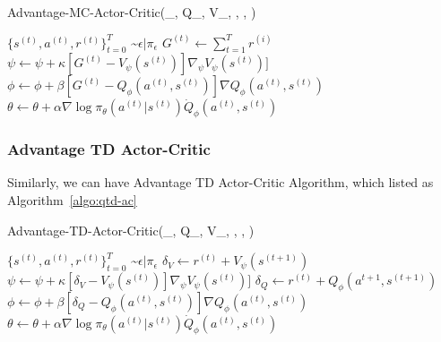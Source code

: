 \documentclass[11pt]{article}
\begin{document}
\begin{algorithm}[H]
\caption{Advantage-MC-Actor-Critic(\pi_{\epsilon}, Q_\phi, V_\psi, \alpha, \beta, \kappa)}
\label{algo:qmc-ac}
\begin{algorithmic}[1]
\STATE $\{ s^{(t)}, a^{(t)}, r^{(t)} \}_{t=0}^T$ \sim $\mathcal{\epsilon} | \pi_{\epsilon}$ 
\STATE $G^{(t)} \leftarrow \sum_{t=1}^T r^{(i)}$
\STATE $\psi \leftarrow \psi + \kappa[G^{(t)} - V_\psi (s^{(t)})] \nabla_\psi V_\psi(s^{(t)})]$
\STATE $\phi \leftarrow \phi + \beta[G^{(t)} - Q_\phi (a^{(t)}, s^{(t)})]\nabla Q_\phi (a^{(t)}, s^{(t)})$
\STATE $\theta \leftarrow \theta + \alpha \nabla \log \pi_\theta (a^{(t)} | s^{(t)}) \dot Q_\phi (a^{(t)}, s^{(t)})$

\ENDFOR
\ENDFOR
\end{algorithmic}
\end{algorithm}

\subsubsection{Advantage TD Actor-Critic}
Similarly, we can have Advantage TD Actor-Critic Algorithm, which listed as Algorithm~\ref{algo:qtd-ac}
\begin{algorithm}[H]
\caption{Advantage-TD-Actor-Critic(\pi_{\epsilon}, Q_\phi, V_\psi, \alpha, \beta, \kappa)}
\label{algo:qtd-ac}
\begin{algorithmic}[1]
\STATE $\{ s^{(t)}, a^{(t)}, r^{(t)} \}_{t=0}^T$ \sim $\mathcal{\epsilon} | \pi_{\epsilon}$ 
\STATE $\delta_V \leftarrow r^{(t)} + V_\psi (s^{(t+1)})$
\STATE $\psi \leftarrow \psi + \kappa[\delta_V - V_\psi (s^{(t)})] \nabla_\psi V_\psi(s^{(t)})]$
\STATE $\delta_Q \leftarrow r^{(t)} + Q_\phi (a^{t+1}, s^{(t+1)})$
\STATE $\phi \leftarrow \phi + \beta[\delta_Q - Q_\phi (a^{(t)}, s^{(t)})]\nabla Q_\phi (a^{(t)}, s^{(t)})$
\STATE $\theta \leftarrow \theta + \alpha \nabla \log \pi_\theta (a^{(t)} | s^{(t)}) \dot Q_\phi (a^{(t)}, s^{(t)})$

\ENDFOR
\ENDFOR
\end{algorithmic}
\end{algorithm}

{


}


\end{document}
